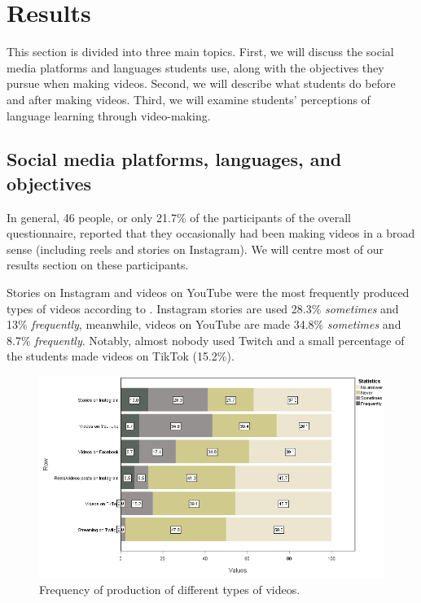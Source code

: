 \section{Results}\label{sec-results}

This section is divided into three main topics. First, we will discuss
the social media platforms and languages students use, along with the
objectives they pursue when making videos. Second, we will describe what
students do before and after making videos. Third, we will examine
students' perceptions of language learning through video-making.

\subsection{Social media platforms, languages, and objectives}\label{sub-sec-socialmediaplatforms}

In general, 46 people, or only 21.7\% of the participants of the overall
questionnaire, reported that they occasionally had been making videos in
a broad sense (including reels and stories on Instagram). We will centre
most of our results section on these participants.

Stories on Instagram and videos on YouTube were the most frequently
produced types of videos according to . Instagram stories are
used 28.3\% \emph{sometimes} and 13\% \emph{frequently}, meanwhile,
videos on YouTube are made 34.8\% \emph{sometimes} and 8.7\%
\emph{frequently}. Notably, almost nobody used Twitch and a small
percentage of the students made videos on TikTok (15.2\%).

\begin{figure}[htbp]
\centering
\begin{minipage}{\textwidth}
\includegraphics[width=\textwidth]{Fig-1.png}
\caption{Frequency of production of different types of videos.}
\label{fig-01}
\end{minipage}
\end{figure}

